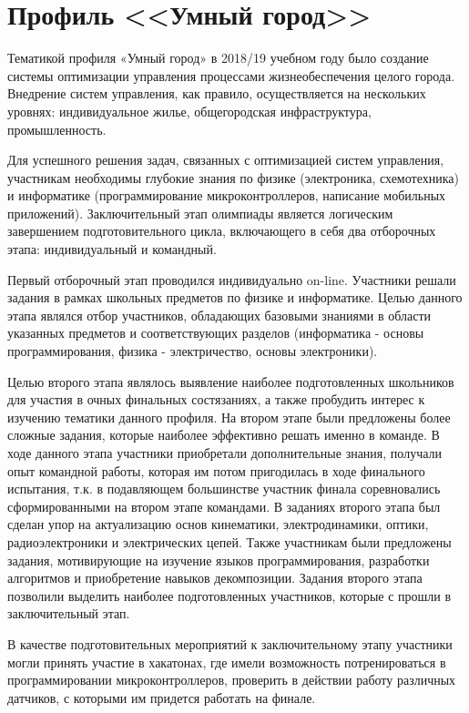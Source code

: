 

\chapter{Профиль <<Умный город>>}

Тематикой профиля «Умный город» в 2018/19 учебном году было создание системы оптимизации управления процессами жизнеобеспечения целого города. Внедрение систем управления, как правило, осуществляется на нескольких уровнях: индивидуальное жилье, общегородская инфраструктура, промышленность.

Для успешного решения задач, связанных с оптимизацией систем управления, участникам необходимы глубокие знания по физике (электроника, схемотехника) и информатике (программирование микроконтроллеров, написание мобильных приложений). Заключительный этап олимпиады является логическим завершением подготовительного цикла, включающего в себя два отборочных этапа: индивидуальный и командный.

Первый отборочный этап проводился индивидуально on-line. Участники решали задания в рамках школьных предметов по физике и информатике. Целью данного этапа являлся отбор участников, обладающих базовыми знаниями в области указанных предметов и соответствующих разделов (информатика - основы программирования, физика - электричество, основы электроники).

Целью второго этапа являлось выявление наиболее подготовленных школьников для участия в очных финальных состязаниях, а также пробудить интерес к изучению тематики данного профиля. На втором этапе были предложены более сложные задания, которые наиболее эффективно решать именно в команде. В ходе данного этапа участники приобретали дополнительные знания, получали опыт командной работы, которая им потом пригодилась в ходе финального испытания, т.к. в подавляющем большинстве участник финала соревновались  сформированными на втором этапе командами. В заданиях второго этапа был сделан упор на актуализацию основ кинематики, электродинамики, оптики, радиоэлектроники и электрических цепей.  Также участникам были предложены задания, мотивирующие на изучение языков программирования, разработки алгоритмов и приобретение навыков декомпозиции. Задания второго этапа позволили выделить наиболее подготовленных участников, которые с прошли в заключительный этап.

В качестве подготовительных мероприятий к заключительному этапу участники могли принять участие в хакатонах, где имели возможность потренироваться в программировании микроконтроллеров, проверить в действии работу различных датчиков, с которыми им придется работать на финале.

